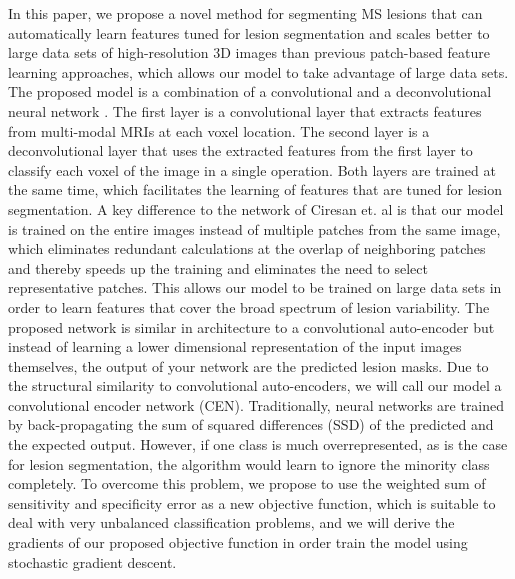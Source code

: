 % 
% 
%   

In this paper, we propose a novel method for segmenting MS lesions that can
automatically learn features tuned for lesion segmentation and scales better to
large data sets of high-resolution 3D images than previous patch-based feature
learning approaches, which allows our model to take advantage of large data
sets. The proposed model is a combination of a convolutional \cite{LeCun1998}
and a deconvolutional neural network \cite{zeiler2011}. The first layer is a
convolutional layer that extracts features from multi-modal MRIs at each voxel
location. The second layer is a deconvolutional layer that uses the extracted
features from the first layer to classify each voxel of the image in a single
operation. Both layers are trained at the same time, which facilitates the
learning of features that are tuned for lesion segmentation. A key difference to
the network of Ciresan et. al \cite{Ciresan2012} is that our model is trained on
the entire images instead of multiple patches from the same image, which
eliminates redundant calculations at the overlap of neighboring patches and
thereby speeds up the training and eliminates the need to select representative
patches. This allows our model to be trained on large data sets in order to
learn features that cover the broad spectrum of lesion variability. The proposed
network is similar in architecture to a convolutional auto-encoder
\cite{masci2011} but instead of learning a lower dimensional representation of
the input images themselves, the output of your network are the predicted lesion
masks. Due to the structural similarity to convolutional auto-encoders, we will
call our model a convolutional encoder network (CEN). Traditionally, neural
networks are trained by back-propagating the sum of squared differences (SSD) of
the predicted and the expected output. However, if one class is much
overrepresented, as is the case for lesion segmentation, the algorithm would
learn to ignore the minority class completely. To overcome this problem, we
propose to use the weighted sum of sensitivity and specificity error as a new
objective function, which is suitable to deal with very unbalanced
classification problems, and we will derive the gradients of our proposed
objective function in order train the model using stochastic gradient descent.

